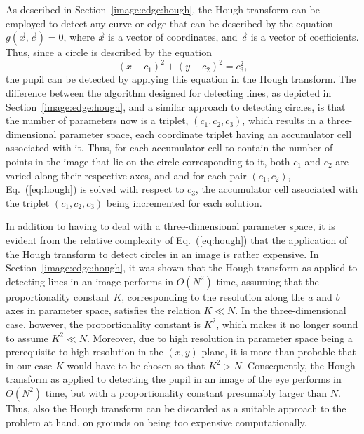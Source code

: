 As described in Section~\ref{image:edge:hough}, the Hough transform
can be employed to detect any curve or edge that can be described by
the equation $g(\vec{x},\vec{c})=0$, where $\vec{x}$ is a vector of
coordinates, and $\vec{c}$ is a vector of coefficients.  Thus, since a
circle is described by the equation
\begin{equation}
\label{eq:hough}
  (x-c_{1})^{2}+(y-c_{2})^{2}=c_{3}^{2}\mbox{,}
\end{equation}
the pupil can be detected by applying this equation in the Hough
transform.  The difference between the algorithm designed for
detecting lines, as depicted in Section~\ref{image:edge:hough}, and a
similar approach to detecting circles, is that the number of
parameters now is a triplet, $(c_{1},c_{2},c_{3})$, which results in a
three-dimensional parameter space, each coordinate triplet having an
accumulator cell associated with it.  Thus, for each accumulator cell
to contain the number of points in the image that lie on the circle
corresponding to it, both $c_{1}$ and $c_{2}$ are varied along their
respective axes, and and for each pair $(c_{1},c_{2})$,
Eq.~(\ref{eq:hough}) is solved with respect to $c_{3}$, the
accumulator cell associated with the triplet $(c_{1},c_{2},c_{3})$
being incremented for each solution.

In addition to having to deal with a three-dimensional parameter
space, it is evident from the relative complexity of
Eq.~(\ref{eq:hough}) that the application of the Hough transform to
detect circles in an image is rather expensive.  In
Section~\ref{image:edge:hough}, it was shown that the Hough transform
as applied to detecting lines in an image performs in $O(N^{2})$ time,
assuming that the proportionality constant $K$, corresponding to the
resolution along the $a$ and $b$ axes in parameter space, satisfies
the relation $K\ll N$.  In the three-dimensional case, however, the
proportionality constant is $K^{2}$, which makes it no longer sound to
assume $K^{2}\ll N$.  Moreover, due to high resolution in parameter
space being a prerequisite to high resolution in the $(x,y)$ plane, it
is more than probable that in our case $K$ would have to be chosen so
that $K^{2}>N$.  Consequently, the Hough transform as applied to
detecting the pupil in an image of the eye performs in $O(N^{2})$
time, but with a proportionality constant presumably larger than $N$.
Thus, also the Hough transform can be discarded as a suitable approach
to the problem at hand, on grounds on being too expensive
computationally.
